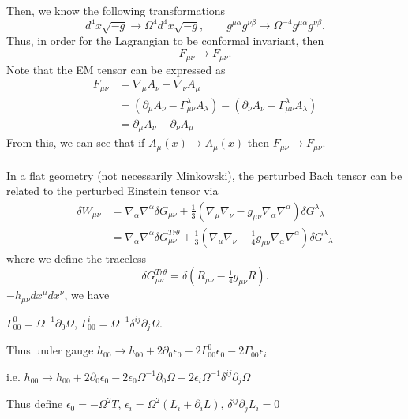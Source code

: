 \documentclass[10pt,letterpaper]{article}
\begin{document}
Then, we know the following transformations
\begin{equation}
	d^4x \sqrt{-g} \to \Omega^4 d^4x \sqrt{-g},\qquad
	g^{\mu\alpha}g^{\nu\beta} \to \Omega^{-4}g^{\mu\alpha}g^{\nu\beta}.
\end{equation} 
Thus, in order for the Lagrangian to be conformal invariant, then 
\begin{equation}
	F_{\mu\nu} \to F_{\mu\nu}.
\end{equation}
Note  that the EM tensor can be expressed as
\begin{align}
	F_{\mu\nu} &= \nabla_\mu A_\nu - \nabla_\nu A_\mu\\
	&= (\partial_\mu A_\nu - \Gamma^{\lambda}_{\mu\nu}A_\lambda)
	-(\partial_\nu A_\nu - \Gamma^{\lambda}_{\mu\nu}A_\lambda)\\
	&= \partial_\mu A_\nu - \partial_\nu A_\mu
\end{align} 
From this, we can see that if $A_\mu(x) \to A_\mu(x)$ then $F_{\mu\nu} \to F_{\mu\nu}$. 
\\ \\
In a flat geometry (not necessarily Minkowski), the perturbed Bach tensor can be related to the perturbed Einstein tensor via
\begin{align}
	\delta W_{\mu\nu} &= \nabla_\alpha \nabla^\alpha \delta G_{\mu\nu} + \frac13( \nabla_\mu \nabla_\nu - g_{\mu\nu}\nabla_\alpha \nabla^\alpha)\delta G^\lambda{}_\lambda\\
	&= \nabla_\alpha \nabla^\alpha \delta G^{Tr\theta}_{\mu\nu} + \frac13( \nabla_\mu \nabla_\nu - \tfrac14 g_{\mu\nu}\nabla_\alpha \nabla^\alpha)\delta G^\lambda{}_\lambda
\end{align}
where we define the traceless
\begin{equation}
 \delta G^{Tr\theta}_{\mu\nu} = \delta (R_{\mu\nu} - \tfrac14 g_{\mu\nu} R).
\end{equation}
$-h_{\mu\nu}dx^{\mu}dx^{\nu}$, we have


$\Gamma^0_{00}=\Omega^{-1}\partial_0\Omega$, $\Gamma^i_{00}=\Omega^{-1}\delta^{ij}\partial_j\Omega$.


Thus under gauge $h_{00}\rightarrow h_{00} +2\partial_0\epsilon_0-2\Gamma^0_{00}\epsilon_0
-2\Gamma^i_{00}\epsilon_i$


i.e. $h_{00}\rightarrow h_{00} +2\partial_0\epsilon_0-2\epsilon_0\Omega^{-1}\partial_0\Omega
-2\epsilon_i\Omega^{-1}\delta^{ij}\partial_j\Omega$


Thus define $\epsilon_0=-\Omega^2 T$, $\epsilon_i=\Omega^2(L_i+\partial_iL)$, $\delta^{ij}\partial_jL_i=0$
\end{document}
